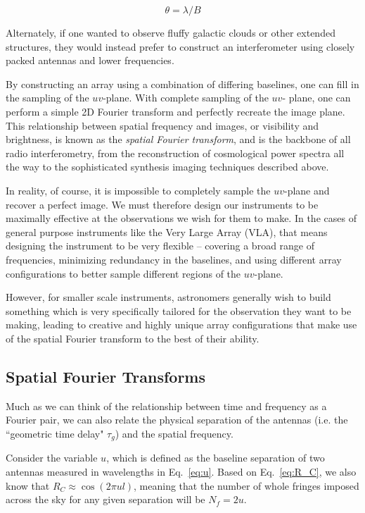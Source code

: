 \begin{equation}
    \theta = \lambda / B
    \label{eq:rayleigh}
\end{equation}

Alternately, if one wanted to observe fluffy galactic clouds or other extended 
structures, they would instead prefer to construct an interferometer using 
closely packed antennas and lower frequencies.

By constructing an array using a combination of differing baselines, one can 
fill in the sampling of the $uv$-plane. With complete sampling of the $uv$-
plane, one can perform a simple 2D Fourier transform and perfectly recreate the 
image plane. This relationship between spatial frequency and images, or 
visibility and brightness, is known as the \emph{spatial Fourier transform}, 
and is the backbone of all radio interferometry, from the reconstruction of 
cosmological power spectra all the way to the sophisticated synthesis imaging 
techniques described above.

In reality, of course, it is impossible to completely sample the $uv$-plane and 
recover a perfect image. We must therefore design our instruments to be 
maximally effective at the observations we wish for them to make. In the cases 
of general purpose instruments like the Very Large Array (VLA), that means 
designing the instrument to be very flexible -- covering a broad range of 
frequencies, minimizing redundancy in the baselines, and using different array 
configurations to better sample different regions of the $uv$-plane.

However, for smaller scale instruments, astronomers generally wish to build 
something which is very specifically tailored for the observation they want to 
be making, leading to creative and highly unique array configurations that make 
use of the spatial Fourier transform to the best of their ability.

\subsection{Spatial Fourier Transforms}

Much as we can think of the relationship between time and frequency as a 
Fourier pair, we can also relate the physical separation of the antennas (i.e.  
the ``geometric time delay" $\tau_g$) and the spatial frequency.

Consider the variable $u$, which is defined as the baseline separation of two 
antennas measured in wavelengths in Eq.~\eqref{eq:u}.  Based on 
Eq.~\eqref{eq:R_C}, we also know that $R_C \approx \cos(2\pi u l)$, meaning 
that the number of whole fringes imposed across the sky for any given 
separation will be $N_f = 2u$. 

